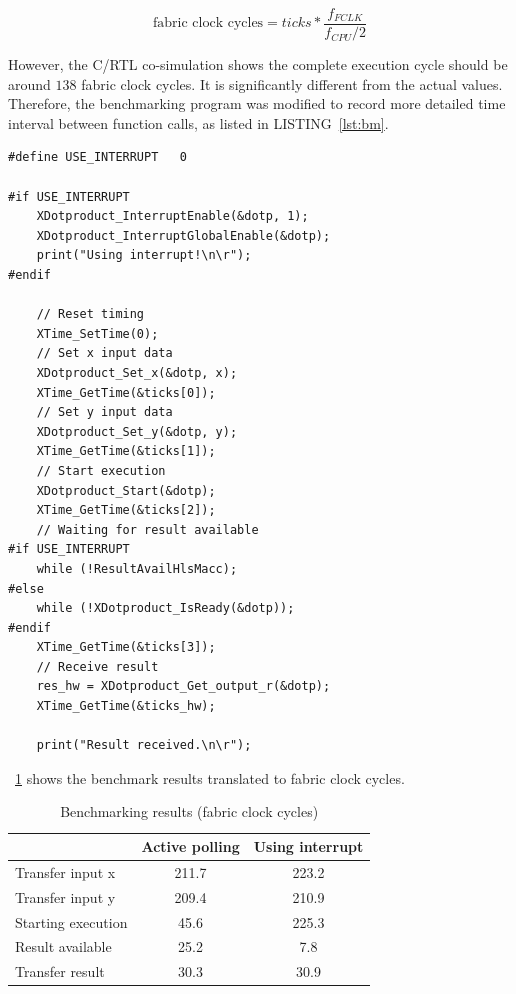 \documentclass[journal]{IEEEtran}
\newcommand{\tref}[1]{\tablename~\ref{#1}}
\newcommand{\lref}[1]{LISTING~\ref{#1}}
\begin{document}
\begin{equation}
\textrm{fabric clock cycles} = ticks * \frac{f_{FCLK}}{f_{CPU} / 2}
\label{eq:clk}
\end{equation}

However, the C/RTL co-simulation shows the complete execution cycle should be around $138$ fabric clock cycles. It is significantly different from the actual values. Therefore, the benchmarking program was modified to record more detailed time interval between function calls, as listed in \lref{lst:bm}.

\begin{lstlisting}[caption={Code segment of benchmarking program},captionpos=b,label=lst:bm]
#define USE_INTERRUPT	0

#if USE_INTERRUPT
	XDotproduct_InterruptEnable(&dotp, 1);
	XDotproduct_InterruptGlobalEnable(&dotp);
	print("Using interrupt!\n\r");
#endif

	// Reset timing
	XTime_SetTime(0);
	// Set x input data
	XDotproduct_Set_x(&dotp, x);
	XTime_GetTime(&ticks[0]);
	// Set y input data
	XDotproduct_Set_y(&dotp, y);
	XTime_GetTime(&ticks[1]);
	// Start execution
	XDotproduct_Start(&dotp);
	XTime_GetTime(&ticks[2]);
	// Waiting for result available
#if USE_INTERRUPT
	while (!ResultAvailHlsMacc);
#else
	while (!XDotproduct_IsReady(&dotp));
#endif
	XTime_GetTime(&ticks[3]);
	// Receive result
	res_hw = XDotproduct_Get_output_r(&dotp);
	XTime_GetTime(&ticks_hw);

	print("Result received.\n\r");
\end{lstlisting}

\tref{tbl:bm} shows the benchmark results translated to fabric clock cycles.

\begin{table}[!ht]
	\renewcommand{\arraystretch}{1.3}
	\caption{Benchmarking results (fabric clock cycles)}
	\label{tbl:bm}
	\centering
	\begin{tabular}{lcc}
		\hline
		& Active polling	& Using interrupt	\\
		\hline
		Transfer input x	& 211.7	& 223.2	\\
		Transfer input y	& 209.4	& 210.9	\\
		Starting execution	& 45.6	& 225.3	\\
		Result available	& 25.2	& 7.8	\\
		Transfer result		& 30.3	& 30.9	\\
		\hline
	\end{tabular}
\end{table}
\end{document}

